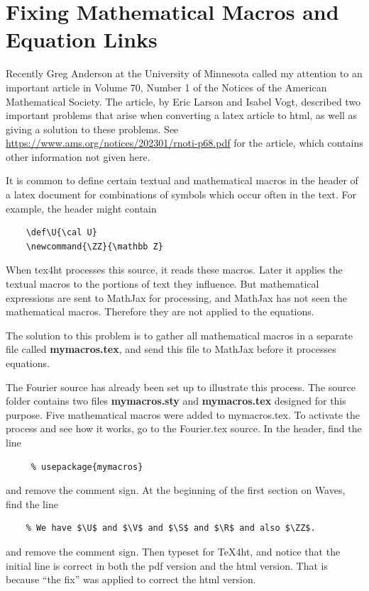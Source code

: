 \documentclass[11pt, oneside]{article}   	%
\begin{document}
\newpage

\section{Fixing Mathematical Macros and Equation Links}

Recently Greg Anderson at the University of Minnesota called my attention to an important
article in Volume 70, Number 1 of the Notices of the American Mathematical Society. The
article, by Eric Larson and Isabel Vogt, described two important problems that arise when
converting a latex article to html, as well as giving a solution to these problems. See
\url{https://www.ams.org/notices/202301/rnoti-p68.pdf} for the article, which contains other
information not given here.


It is common to define certain textual and mathematical macros in the header of a latex document for
combinations of symbols which occur often in the text. For example, the header might contain
\begin{verbatim}
    \def\U{\cal U}
    \newcommand{\ZZ}{\mathbb Z}
\end{verbatim}
When tex4ht processes this source, it reads these macros. Later it applies the textual macros
to the portions of text they influence. But mathematical expressions are sent to MathJax for
processing, and MathJax has not seen the mathematical macros. Therefore they are not applied to the
equations.

The solution to this problem is to gather  all mathematical macros in a separate
file called  {\bf mymacros.tex}, and send this file to MathJax before it processes equations. 

The Fourier source
has already been set up to illustrate this process. The source folder contains two files
{\bf mymacros.sty} and {\bf mymacros.tex} designed for this purpose. Five mathematical macros
were added to mymacros.tex. To activate the process and see how it works,
go to the Fourier.tex source. In the header, find the line
\begin{verbatim}
     % usepackage{mymacros}
\end{verbatim}
and remove the comment sign. At the beginning of the first section on Waves, find the line
\begin{verbatim}
    % We have $\U$ and $\V$ and $\S$ and $\R$ and also $\ZZ$.
\end{verbatim}
and remove the comment sign. Then typeset for TeX4ht, and notice that the initial
line is correct in both the pdf version and the html version. That is because ``the fix'' was
applied to correct the html version.
\end{document}
